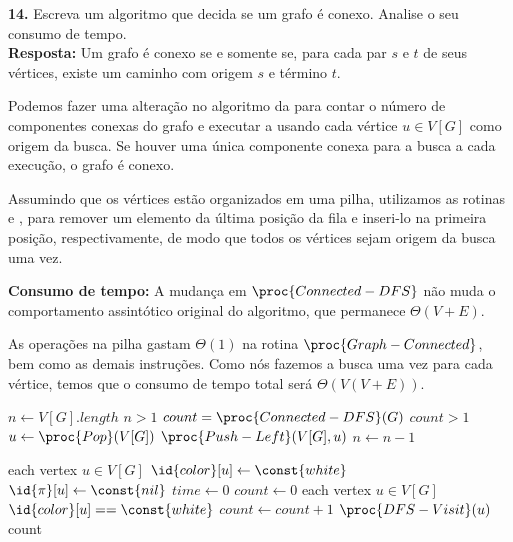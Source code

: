 
\noindent\textbf{14.} Escreva um algoritmo que decida se um grafo é conexo. Analise o seu consumo de tempo.\\[6pt]
\textbf{Resposta:} Um grafo é conexo se e somente se, para cada par $s$ e $t$ de seus vértices, existe um caminho com origem $s$ e término $t$.

Podemos fazer uma alteração no algoritmo da  para contar o número de componentes conexas do grafo e executar a  usando cada vértice $u \in V[G]$ como origem da busca. Se houver uma única componente conexa para a busca a cada execução, o grafo é conexo.

Assumindo que os vértices estão organizados em uma pilha, utilizamos as rotinas  e , para remover um elemento da última posição da fila e inseri-lo na primeira posição, respectivamente, de modo que todos os vértices sejam origem da busca uma vez.

\textbf{Consumo de tempo:} A mudança em $\proc{Connected-DFS}$ não muda o comportamento assintótico original do algoritmo, que permanece $\Theta(V + E)$.

As operações na pilha gastam $\Theta(1)$ na rotina $\proc{Graph-Connected}$, bem como as demais instruções. Como nós fazemos a busca uma vez para cada vértice, temos que o consumo de tempo total será $\Theta(V(V + E))$.

\begin{codebox}
\li	$n \gets V[G].length$
\li \While $n > 1$
\li \Do
        $count = \proc{Connected-DFS}(G)$
\li     \If $count > 1$
\li     \Then 
            \Return {}
        \End
\li     $u \gets \proc{Pop}(V[G])$
\li     $\proc{Push-Left}(V[G], u)$
\li     $n \gets n - 1$
    \End
\li \Return {}
\end{codebox}

\begin{codebox}
\li \For each vertex $u \in V[G]$
\li \Do
        $\id{color}[u] \gets \const{white}$
\li     $\id{\pi}[u] \gets \const{nil}$
    \End
\li $time \gets 0$
\li $count \gets 0$
\li \For each vertex $u \in V[G]$
\li \Do
        \If $\id{color}[u] == \const{white}$
\li     \Then 
            $count \gets count + 1$
\li         $\proc{DFS-Visit}(u)$
        \End
    \End
\li \Return count
\end{codebox}